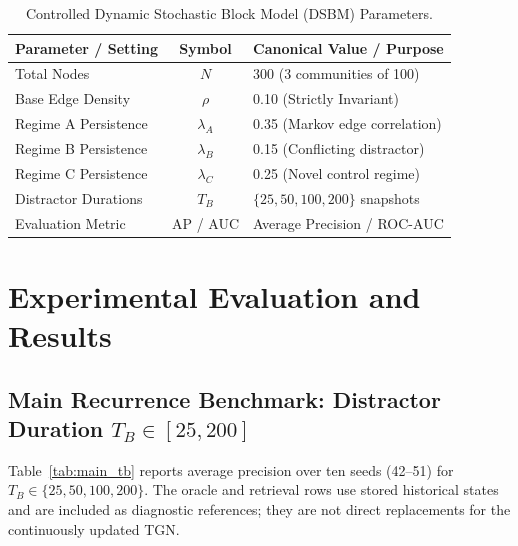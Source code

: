 \documentclass[conference]{IEEEtran}
\begin{document}
\begin{table}[htbp]
\caption{Controlled Dynamic Stochastic Block Model (DSBM) Parameters.}
\label{tab:dsbm_params}
\centering
\begin{tabular}{p{2.8cm}cp{3.8cm}}
\toprule
\textbf{Parameter / Setting} & \textbf{Symbol} & \textbf{Canonical Value / Purpose} \\
\midrule
Total Nodes & $N$ & 300 (3 communities of 100) \\
Base Edge Density & $\rho$ & 0.10 (Strictly Invariant) \\
Regime A Persistence & $\lambda_A$ & 0.35 (Markov edge correlation) \\
Regime B Persistence & $\lambda_B$ & 0.15 (Conflicting distractor) \\
Regime C Persistence & $\lambda_C$ & 0.25 (Novel control regime) \\
Distractor Durations & $T_B$ & $\{25, 50, 100, 200\}$ snapshots \\
Evaluation Metric & AP / AUC & Average Precision / ROC-AUC \\
\bottomrule
\end{tabular}
\end{table}

\section{Experimental Evaluation and Results}

\subsection{Main Recurrence Benchmark: Distractor Duration $T_B \in [25, 200]$}
Table~\ref{tab:main_tb} reports average precision over ten seeds (42--51) for $T_B \in \{25, 50, 100, 200\}$. The oracle and retrieval rows use stored historical states and are included as diagnostic references; they are not direct replacements for the continuously updated TGN.
\end{document}
